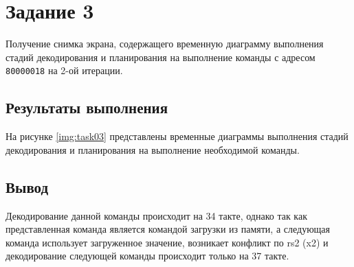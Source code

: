 \chapter{Задание 3}

Получение снимка экрана, содержащего временную диаграмму выполнения стадий
декодирования и планирования на выполнение команды с адресом \texttt{80000018}
на 2-ой итерации.

\section{Результаты выполнения}

На рисунке \ref{img:task03} представлены временные диаграммы выполнения стадий
декодирования и планирования на выполнение необходимой команды.


\section{Вывод}

Декодирование данной команды происходит на 34 такте, однако так как
представленная команда является командой загрузки из памяти, а следующая
команда использует загруженное значение, возникает конфликт по rs2 (x2) и
декодирование следующей команды происходит только на 37 такте.
